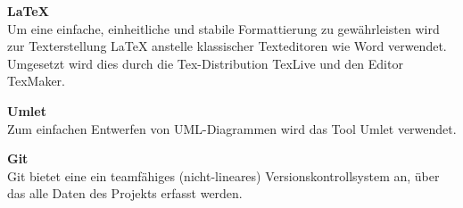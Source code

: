 \begin{description}
\item \textbf{LaTeX} \hfill \\
Um eine einfache, einheitliche und stabile Formattierung zu gewährleisten wird zur Texterstellung LaTeX  anstelle klassischer Texteditoren wie Word verwendet. Umgesetzt wird dies durch die Tex-Distribution TexLive und den Editor TexMaker.

\item \textbf{Umlet} \hfill \\
Zum einfachen Entwerfen von UML-Diagrammen wird das Tool Umlet verwendet.

\item \textbf{Git} \hfill \\
Git bietet eine ein teamfähiges (nicht-lineares) Versionskontrollsystem an, über das alle Daten des Projekts erfasst werden.

\end{description}
